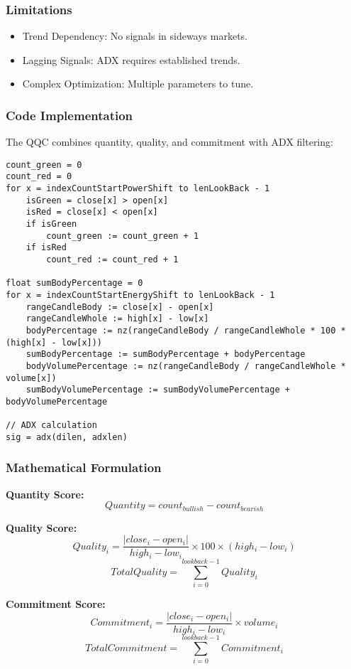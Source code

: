 \documentclass[12pt]{article}
\begin{document}
\subsubsection{Limitations}
\begin{itemize}
\item Trend Dependency: No signals in sideways markets.
\item Lagging Signals: ADX requires established trends.
\item Complex Optimization: Multiple parameters to tune.
\end{itemize}

\subsubsection{Code Implementation}
The QQC combines quantity, quality, and commitment with ADX filtering:

\begin{lstlisting}[language=Pine, caption=Pine Script Code for QQC Calculation]
count_green = 0
count_red = 0
for x = indexCountStartPowerShift to lenLookBack - 1
    isGreen = close[x] > open[x]
    isRed = close[x] < open[x]
    if isGreen
        count_green := count_green + 1
    if isRed
        count_red := count_red + 1

float sumBodyPercentage = 0
for x = indexCountStartEnergyShift to lenLookBack - 1
    rangeCandleBody := close[x] - open[x]
    rangeCandleWhole := high[x] - low[x]
    bodyPercentage := nz(rangeCandleBody / rangeCandleWhole * 100 * (high[x] - low[x]))
    sumBodyPercentage := sumBodyPercentage + bodyPercentage
    bodyVolumePercentage := nz(rangeCandleBody / rangeCandleWhole * volume[x])
    sumBodyVolumePercentage := sumBodyVolumePercentage + bodyVolumePercentage

// ADX calculation
sig = adx(dilen, adxlen)
\end{lstlisting}

\subsubsection{Mathematical Formulation}
\textbf{Quantity Score:}
\[
Quantity = count_{bullish} - count_{bearish}
\]

\textbf{Quality Score:}
\[
Quality_i = \frac{|close_i - open_i|}{high_i - low_i} \times 100 \times (high_i - low_i)
\]
\[
TotalQuality = \sum_{i=0}^{lookback-1} Quality_i
\]

\textbf{Commitment Score:}
\[
Commitment_i = \frac{|close_i - open_i|}{high_i - low_i} \times volume_i
\]
\[
TotalCommitment = \sum_{i=0}^{lookback-1} Commitment_i
\]
\end{document}
